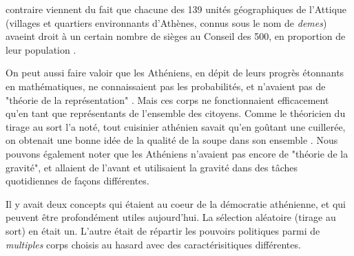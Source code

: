 contraire viennent du fait que chacune des 139 unités géographiques de
l'Attique (villages et quartiers environnants d'Athènes, connus sous
le nom de \emph{demes}) avaeint droit à un certain nombre de sièges au
Conseil des 500, en proportion de leur population \cite{hans99}.\par 
On peut aussi faire valoir que les Athéniens, en dépit de leurs
progrès étonnants en mathématiques, ne connaissaient pas les
probabilités, et n'avaient pas de "théorie de la représentation"
\cite{pitkin67}. Mais ces corps ne fonctionnaient efficacement
qu'en tant que représentants de l'ensemble des citoyens. Comme le
théoricien du tirage au sort \cite{sutherland08} l'a noté, tout
cuisinier athénien savait qu'en goûtant une cuillerée, on obtenait une bonne
idée de la qualité de la soupe dans son ensemble
\cite{sutherland08}. Nous pouvons également noter que les 
Athéniens n'avaient pas encore de "théorie de la gravité", et allaient
de l'avant et utilisaient la gravité dans des tâches quotidiennes de
façons différentes.\par 
Il y avait deux concepts qui étaient au coeur de la démocratie
athénienne, et qui peuvent être profondément utiles aujourd'hui. La
sélection aléatoire (tirage au sort) en était un. L'autre était de
répartir les pouvoirs politiques parmi de \emph{multiples} corps
choisis au hasard avec des caractérisitiques différentes.\par

